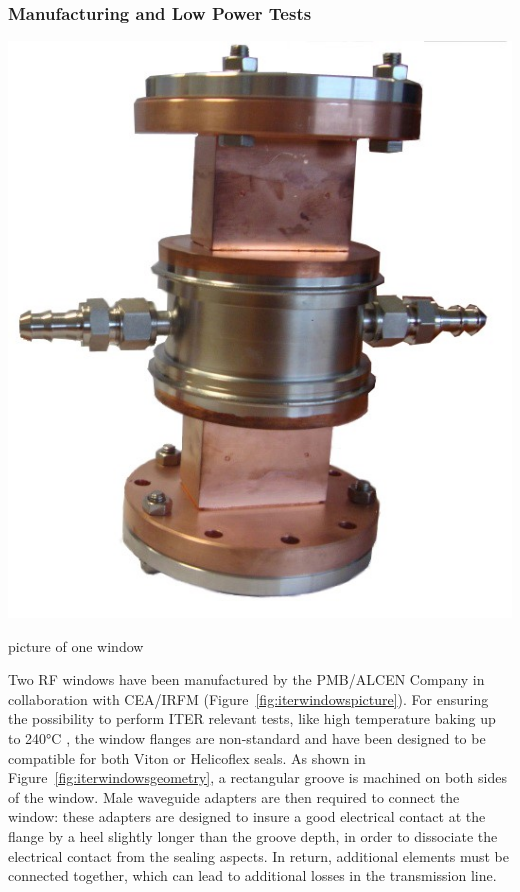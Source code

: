 \subsubsection{Manufacturing and Low Power Tests}\label{sec:ITER_windows_manuf_low_power_tests}
\begin{marginfigure}
	\centering
	\includegraphics[width=1.0\linewidth]{figures/chap3/ITER_window/ITER_windows_picture}
	\caption{picture of one window}
	\label{fig:iterwindowspicture}
\end{marginfigure}
Two RF windows have been manufactured by the PMB/ALCEN Company in collaboration with CEA/IRFM (Figure~\ref{fig:iterwindowspicture}). For ensuring the possibility to perform ITER relevant tests, like high temperature baking up to 240$\si{\degreeCelsius}$ , the window flanges are non-standard and have been designed to be compatible for both Viton or Helicoflex seals. As shown in Figure~\ref{fig:iterwindowsgeometry}, a rectangular groove is machined on both sides of the window. Male waveguide adapters are then required to connect the window: these adapters are designed to insure a good electrical contact at the flange by a heel slightly longer than the groove depth, in order to dissociate the electrical contact from the sealing aspects. In return, additional elements must be connected together, which can lead to additional losses in the transmission line.   

